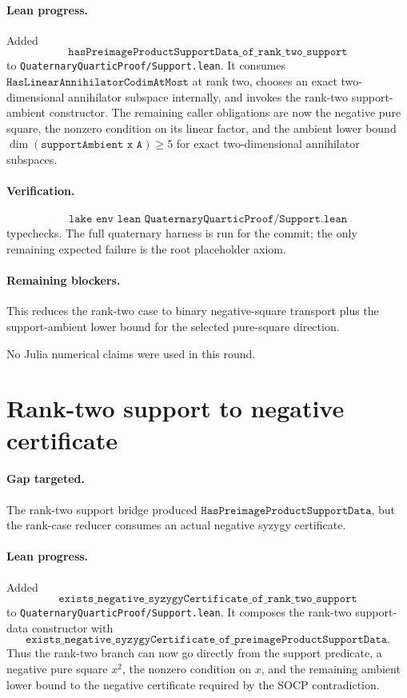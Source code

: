 \documentclass[11pt]{article}
\begin{document}
\paragraph{Lean progress.}
Added
\[
\texttt{hasPreimageProductSupportData\_of\_rank\_two\_support}
\]
to \texttt{QuaternaryQuarticProof/Support.lean}.  It consumes
\(\texttt{HasLinearAnnihilatorCodimAtMost}\) at rank two, chooses an exact
two-dimensional annihilator subspace internally, and invokes the rank-two
support-ambient constructor.  The remaining caller obligations are now the
negative pure square, the nonzero condition on its linear factor, and the
ambient lower bound \(\dim(\texttt{supportAmbient x A})\ge5\) for exact
two-dimensional annihilator subspaces.

\paragraph{Verification.}
\[
\texttt{lake env lean QuaternaryQuarticProof/Support.lean}
\]
typechecks.  The full quaternary harness is run for the commit; the only
remaining expected failure is the root placeholder axiom.

\paragraph{Remaining blockers.}
This reduces the rank-two case to binary negative-square transport plus the
support-ambient lower bound for the selected pure-square direction.

No Julia numerical claims were used in this round.

\section*{Rank-two support to negative certificate}

\paragraph{Gap targeted.}
The rank-two support bridge produced
\(\texttt{HasPreimageProductSupportData}\), but the rank-case reducer consumes
an actual negative syzygy certificate.

\paragraph{Lean progress.}
Added
\[
\texttt{exists\_negative\_syzygyCertificate\_of\_rank\_two\_support}
\]
to \texttt{QuaternaryQuarticProof/Support.lean}.  It composes the rank-two
support-data constructor with
\[
\texttt{exists\_negative\_syzygyCertificate\_of\_preimageProductSupportData}.
\]
Thus the rank-two branch can now go directly from the support predicate, a
negative pure square \(x^2\), the nonzero condition on \(x\), and the remaining
ambient lower bound to the negative certificate required by the SOCP
contradiction.
\end{document}
